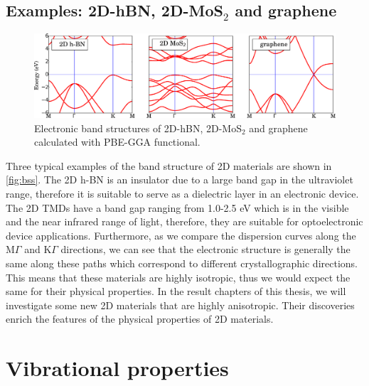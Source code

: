 \subsection{Examples: 2D-hBN, 2D-MoS$_2$ and graphene}
\begin{figure}[htbp!] 
\centering  
\includegraphics[width=\textwidth]{bss.eps}
\caption[Electronic band structures of 2D-hBN, 2D-MoS$_2$ and graphene]{ Electronic band structures of 2D-hBN, 2D-MoS$_2$ and graphene calculated with PBE-GGA functional. }  
\label{fig:bss}
\end{figure} 
Three typical examples of the band structure of 2D materials are shown in \autoref{fig:bss}. The 2D h-BN is an insulator due to a large band gap in the ultraviolet range, therefore it is suitable to serve as a dielectric layer in an electronic device. The 2D TMDs have a band gap ranging from 1.0-2.5 eV which is in the visible and the near infrared range of light, therefore, they are suitable for optoelectronic device applications. Furthermore, as we compare the dispersion curves along the $\mathrm{M}\Gamma$ and $\mathrm{K}\Gamma$ directions, we can see that the electronic structure is generally the same along these paths which correspond to different crystallographic directions. This means that these materials are highly isotropic, thus we would expect the same for their physical properties. In the result chapters of this thesis, we will investigate some new 2D materials that are highly anisotropic. Their discoveries enrich the features of the physical properties of 2D materials.

\section{Vibrational properties}

